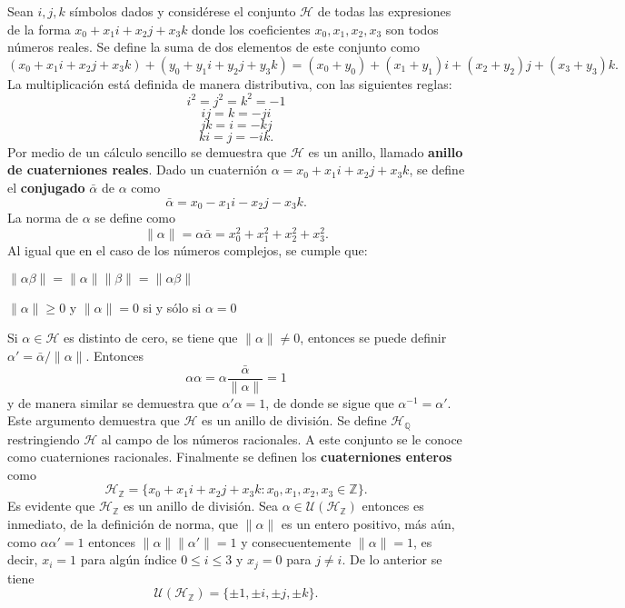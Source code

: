 \begin{ejemplo}
Sean $i,j,k$ símbolos dados y considérese el conjunto $\mathcal{H}$ de todas las expresiones de la forma $x_0 + x_1i+x_2j+x_3k$ donde los coeficientes $x_0,x_1,x_2,x_3$ son todos números reales.
Se define la suma de dos elementos de este conjunto como \[ (x_0 + x_1i+x_2j+x_3k)+(y_0 + y_1i+y_2j+y_3k) = (x_0 + y_0) + (x_1 + y_1)i + (x_2+y_2)j + (x_3+y_3)k.  \] La multiplicación está definida de manera distributiva, con las siguientes reglas:
\begin{equation*}
i^2 = j^2 = k^2 = -1
\end{equation*}
\begin{equation*}
ij = k = -ji
\end{equation*} \[ jk = i = -kj \] \[ ki = j = -ik .\] Por medio de un cálculo sencillo se demuestra que $\mathcal{H}$ es un anillo, llamado \textbf{anillo de cuaterniones reales}. Dado un cuaternión $\alpha = x_0 + x_1i + x_2j + x_3k$, se define el \textbf{conjugado} $\bar{\alpha}$ de $\alpha$ como \[ \bar{\alpha} = x_0-x_1i - x_2j-x_3k. \] La norma de $\alpha$ se define como \[ \lVert \alpha \rVert = \alpha\bar{\alpha} = x_0 ^2 + x_1^2 + x_ 2^2 + x_ 3^2. \]
Al igual que en el caso de los números complejos, se cumple que:
\begin{bulletList}
\item $\lVert \alpha\beta \rVert = \lVert \alpha \rVert \lVert \beta \rVert = \lVert \alpha\beta \rVert$
\item $\lVert \alpha \rVert \geq 0$ y $\lVert \alpha \rVert  = 0 $ si y sólo si $\alpha = 0 $
\end{bulletList}
Si $\alpha \in \mathcal{H}$ es distinto de cero, se tiene que $\lVert \alpha \rVert \neq 0$, entonces se puede definir $\alpha' = \bar{\alpha}/\lVert \alpha \rVert$. Entonces \[ \alpha\alpha= \alpha \frac{\bar{\alpha}}{\lVert \alpha \rVert} = 1 \] y de manera similar se demuestra que $\alpha'\alpha = 1$, de donde se sigue que $\alpha^{-1} = \alpha'$. Este argumento demuestra que $\mathcal{H}$ es un anillo de división.
Se define $\mathcal{H}_{\mathds{Q}}$ restringiendo $\mathcal{H}$ al campo de los números racionales. A este conjunto se le conoce como cuaterniones racionales.
Finalmente se definen los \textbf{cuaterniones enteros} como \[ \mathcal{H}_{\mathds{Z}} = \{ x_0 + x_1i + x_2j + x_3k \colon x_0, x_1, x_2, x_3 \in \mathds{Z} \}. \]
Es evidente que $\mathcal{H}_{\mathds{Z}}$ es un anillo de división.
Sea $\alpha \in \mathcal{U}(\mathcal{H}_{\mathds{Z}})$ entonces es inmediato, de la definición de norma, que $\lVert \alpha \rVert$ es un entero positivo, más aún, como $\alpha\alpha'= 1$ entonces $\lVert \alpha \rVert \lVert \alpha'\rVert = 1$ y consecuentemente $\lVert \alpha \rVert = 1$, es decir, $x_i = 1$ para algún índice $0\leq i \leq 3 $ y $x_j = 0 $ para $j \neq i$. De lo anterior se tiene \[ \mathcal{U}(\mathcal{H}_{\mathds{Z}}) = \{ \pm1, \pm i, \pm j, \pm k \}. \] 
\end{ejemplo} 
